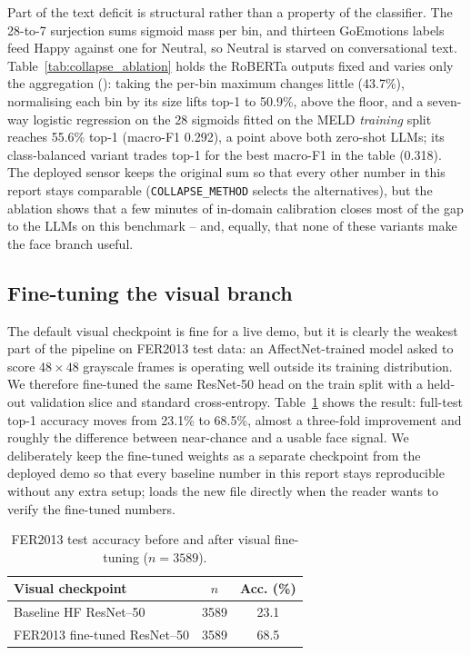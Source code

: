 \documentclass[sigconf,nonacm]{acmart}
\begin{document}
  
  
  

  Part of the text deficit is structural rather than a property of the classifier. The 28-to-7 surjection sums sigmoid mass per bin, and thirteen GoEmotions labels feed Happy against one for Neutral, so Neutral is starved on conversational text. Table~\ref{tab:collapse_ablation} holds the RoBERTa outputs fixed and varies only the aggregation (): taking the per-bin maximum changes little (43.7\%), normalising each bin by its size lifts top-1 to 50.9\%, above the floor, and a seven-way logistic regression on the 28 sigmoids fitted on the MELD \emph{training} split reaches 55.6\% top-1 (macro-F1 0.292), a point above both zero-shot LLMs; its class-balanced variant trades top-1 for the best macro-F1 in the table (0.318). The deployed sensor keeps the original sum so that every other number in this report stays comparable (\texttt{COLLAPSE\_METHOD} selects the alternatives), but the ablation shows that a few minutes of in-domain calibration closes most of the gap to the LLMs on this benchmark -- and, equally, that none of these variants make the face branch useful.


  \subsection{Fine-tuning the visual branch}
  The default visual checkpoint is fine for a live demo, but it is clearly the weakest part of the pipeline on FER2013 test data: an AffectNet-trained model asked to score 48$\!\times\!48$ grayscale frames is operating well outside its training distribution. We therefore fine-tuned the same ResNet-50 head on the  train split with a held-out validation slice and standard cross-entropy. Table~\ref{tab:finetune} shows the result: full-test top-1 accuracy moves from 23.1\% to 68.5\%, almost a three-fold improvement and roughly the difference between near-chance and a usable face signal. We deliberately keep the fine-tuned weights as a separate checkpoint from the deployed demo so that every baseline number in this report stays reproducible without any extra setup;  loads the new file directly when the reader wants to verify the fine-tuned numbers.

  \begin{table}[t]
    \centering
    \small
    \caption{FER2013 test accuracy before and after visual fine-tuning ($n=3589$).}
    \label{tab:finetune}
    \begin{tabular}{@{}lcc@{}}
      \toprule
      \textbf{Visual checkpoint} & \textbf{$n$} & \textbf{Acc. (\%)} \\
      \midrule
      Baseline HF ResNet--50 & 3589 & 23.1 \\
      FER2013 fine-tuned ResNet--50 & 3589 & 68.5 \\
      \bottomrule
    \end{tabular}
  \end{table}
\end{document}
